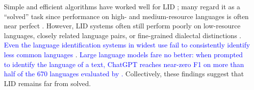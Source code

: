 \documentclass{article}
\newcommand{\corrrev}[1]{\textcolor{blue}{#1}}
\begin{document}
Simple and efficient algorithms have worked well for LID \cite{cavnar01,joulin-etal-2017-bag,lui-baldwin-2012-langid}; many regard it as a \enquote{solved} task since performance on high- and medium-resource languages is often near perfect \cite{mcnamee_solved,lid_survey}. 
However, LID systems often still perform poorly on low-resource languages, closely related language pairs, or fine-grained dialectal distinctions \citep[][\emph{inter alia}]{caswell-etal-2020-language,chifu-etal-2024-vardial,goot-2025-identifying}. 
\corrrev{Even the language identification systems in widest use fail to consistently identify less common languages} \cite{kargaran-etal-2023-glotlid}.
\corrrev{Large language models fare no better: when prompted to identify the language of a text, ChatGPT reaches near-zero F1 on more than half of the 670 languages evaluated by \citet{chen-etal-2024-fumbling}.}
Collectively, these findings suggest that LID remains far from solved.
\end{document}
